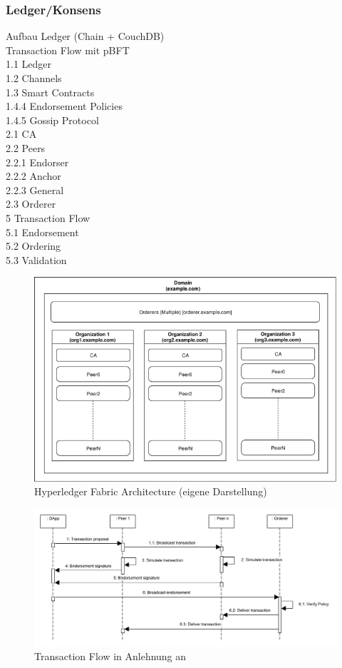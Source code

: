 \subsubsection{Ledger/Konsens}
Aufbau Ledger (Chain + CouchDB)\\
Transaction Flow mit pBFT\\
1.1 Ledger\\
1.2 Channels\\
1.3 Smart Contracts\\
1.4.4 Endorsement Policies\\
1.4.5 Gossip Protocol\\
2.1 CA\\
2.2 Peers\\
2.2.1 Endorser\\
2.2.2 Anchor\\
2.2.3 General\\
2.3 Orderer\\
5 Transaction Flow\\
5.1 Endorsement\\
5.2 Ordering\\
5.3 Validation

\begin{figure}[H]
	\centering
	\includegraphics[width=1\linewidth]{pictures/hyperledger-fabric-architecture}
	\caption[Hyperledger Fabric Architecture]{Hyperledger Fabric Architecture (eigene Darstellung)}
	\label{fig:hyperledger-fabric-architecture}
\end{figure}

\begin{figure}[H]
	\centering
	\includegraphics[width=1\linewidth]{pictures/transaction-flow}
	\caption[Transaction Flow]{Transaction Flow in Anlehnung an \citep{Choudhury2018}}
	\label{fig:transaction-flow}
\end{figure}

